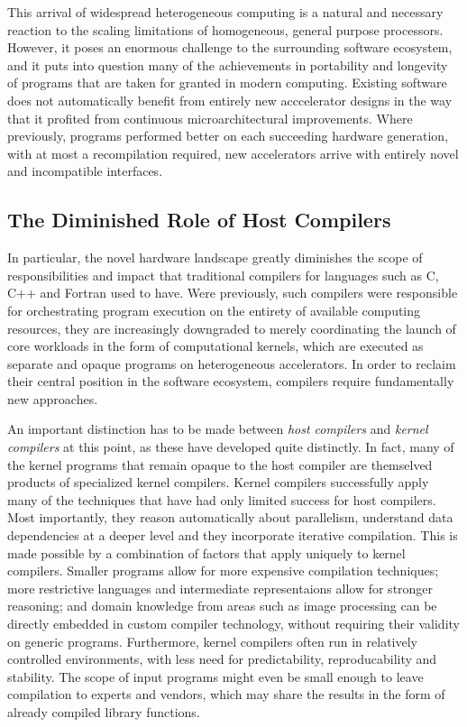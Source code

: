     This arrival of widespread heterogeneous computing is a natural and
    necessary reaction to the scaling limitations of homogeneous, general
    purpose processors.
    However, it poses an enormous challenge to the surrounding software
    ecosystem, and it puts into question many of the achievements in portability
    and longevity of programs that are taken for granted in modern computing.
    Existing software does not automatically benefit from entirely new
    acccelerator designs in the way that it profited from continuous
    microarchitectural improvements.
    Where previously, programs performed better on each succeeding hardware
    generation, with at most a recompilation required, new accelerators arrive
    with entirely novel and incompatible interfaces.

    \subsection*{The Diminished Role of Host Compilers}

    In particular, the novel hardware landscape greatly diminishes the
    scope of responsibilities and impact that traditional compilers for
    languages such as C, C++ and Fortran used to have.
    Were previously, such compilers were responsible for orchestrating
    program execution on the entirety of available computing resources, they are
    increasingly downgraded to merely coordinating the launch of core workloads
    in the form of computational kernels, which are executed as separate and
    opaque programs on heterogeneous accelerators.
    In order to reclaim their central position in the software ecosystem,
    compilers require fundamentally new approaches.

    An important distinction has to be made between {\em host compilers} and
    {\em kernel compilers} at this point, as these have developed quite
    distinctly.
    In fact, many of the kernel programs that remain opaque to the host compiler
    are themselved products of specialized kernel compilers.
    Kernel compilers successfully apply many of the techniques that have had
    only limited success for host compilers.
    Most importantly, they reason automatically about parallelism, understand
    data dependencies at a deeper level and they incorporate iterative
    compilation.
    This is made possible by a combination of factors that apply uniquely to
    kernel compilers.
    Smaller programs allow for more expensive compilation techniques;
    more restrictive languages and intermediate representaions allow for
    stronger reasoning;
    and domain knowledge from areas such as image processing can be directly
    embedded in custom compiler technology, without requiring their validity
    on generic programs.
    Furthermore, kernel compilers often run in relatively controlled
    environments, with less need for predictability, reproducability and
    stability.
    The scope of input programs might even be small enough to leave compilation
    to experts and vendors, which may share the results in the form of already
    compiled library functions.

